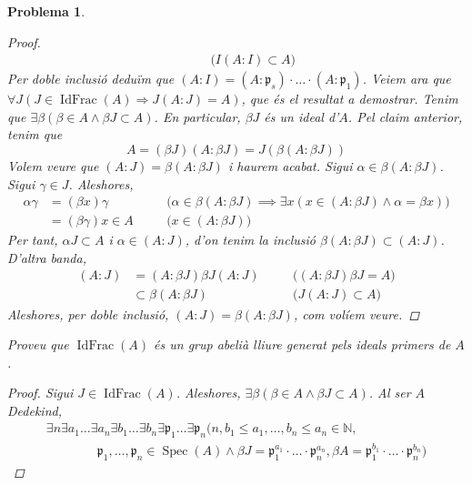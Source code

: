 \documentclass{article}
\DeclareMathOperator{\Spec}{Spec}
\DeclareMathOperator{\IdFrac}{IdFrac}
\newtheorem{problema}{Problema}
\begin{document}
\begin{problema}
\begin{enumerate}
\begin{proof}
\begin{align*}
                &\quad&\textrm{($I(A:I)\subset A$)}
            \end{align*}
            Per doble inclusió deduïm que $(A:I)=(A:\mathfrak{p}_{s})\cdot\ldots\cdot(A:\mathfrak{p}_{1})$.\newline
            Veiem ara que $\forall J(J\in\IdFrac(A)\Rightarrow J(A:J)=A)$, que és el resultat a demostrar. Tenim que $\exists\beta(\beta\in A\land\beta J\subset A)$. En particular, $\beta J$ és un ideal d'$A$. Pel claim anterior, tenim que
            \begin{equation*}
                A
                =(\beta J)(A:\beta J)
                =J(\beta(A:\beta J))
            \end{equation*}
            Volem veure que $(A:J)=\beta(A:\beta J)$ i haurem acabat. Sigui $\alpha\in\beta(A:\beta J)$. Sigui $\gamma\in J$. Aleshores,
            \begin{align*}
                \alpha\gamma
                &=(\beta x)\gamma
                &\quad&\textrm{($\alpha\in\beta(A:\beta J)\implies\exists x(x\in(A:\beta J)\land\alpha=\beta x)$)}\\
                &=(\beta\gamma)x\in A
                &\quad&\textrm{($x\in(A:\beta J)$)}
            \end{align*}
            Per tant, $\alpha J\subset A$ i $\alpha\in(A:J)$, d'on tenim la inclusió $\beta(A:\beta J)\subset(A:J)$. D'altra banda,
            \begin{align*}
                (A:J)
                &=(A:\beta J)\beta J(A:J)
                &\quad&\textrm{($(A:\beta J)\beta J=A$)}\\
                &\subset\beta(A:\beta J)
                &\quad&\textrm{($J(A:J)\subset A$)}
            \end{align*}
            Aleshores, per doble inclusió, $(A:J)=\beta(A:\beta J)$, com volíem veure.
        \end{proof}
        Proveu que $\IdFrac(A)$ és un grup abelià lliure generat pels ideals primers de $A$. 
        \begin{proof}
            Sigui $J\in\IdFrac(A)$. Aleshores, $\exists\beta(\beta\in A\land\beta J\subset A)$. Al ser $A$ Dedekind,
            \begin{align*}
                \exists n\exists a_{1}\ldots\exists a_{n}\exists b_{1}\ldots\exists b_{n}\exists\mathfrak{p}_{1}\ldots\exists\mathfrak{p}_{n}(n,b_{1}\leq a_{1},\ldots,b_{n}\leq a_{n}\in\mathbb{N},\quad\quad\quad\quad\\
                \quad\quad\quad\quad\mathfrak{p}_{1},\ldots,\mathfrak{p}_{n}\in\Spec(A)\land\beta J=\mathfrak{p}_{1}^{a_{1}}\cdot\ldots\cdot\mathfrak{p}_{n}^{a_{n}},\beta A=\mathfrak{p}_{1}^{b_{1}}\cdot\ldots\cdot\mathfrak{p}_{n}^{b_{n}})

\end{align*}
\end{proof}
\end{enumerate}
\end{problema}
\end{document}
